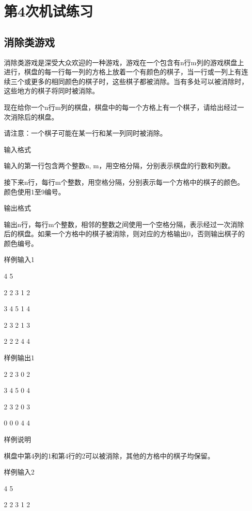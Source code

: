 %
%
%
\chapter{第4次机试练习}

\section{消除类游戏}
消除类游戏是深受大众欢迎的一种游戏，游戏在一个包含有n行m列的游戏棋盘上进行，棋盘的每一行每一列的方格上放着一个有颜色的棋子，当一行或一列上有连续三个或更多的相同颜色的棋子时，这些棋子都被消除。当有多处可以被消除时，这些地方的棋子将同时被消除。

现在给你一个n行m列的棋盘，棋盘中的每一个方格上有一个棋子，请给出经过一次消除后的棋盘。

请注意：一个棋子可能在某一行和某一列同时被消除。

输入格式

输入的第一行包含两个整数n, m，用空格分隔，分别表示棋盘的行数和列数。

接下来n行，每行m个整数，用空格分隔，分别表示每一个方格中的棋子的颜色。颜色使用1至9编号。

输出格式

输出n行，每行m个整数，相邻的整数之间使用一个空格分隔，表示经过一次消除后的棋盘。如果一个方格中的棋子被消除，则对应的方格输出0，否则输出棋子的颜色编号。

样例输入1

4 5

2 2 3 1 2

3 4 5 1 4

2 3 2 1 3

2 2 2 4 4

样例输出1

2 2 3 0 2

3 4 5 0 4

2 3 2 0 3

0 0 0 4 4

样例说明

棋盘中第4列的1和第4行的2可以被消除，其他的方格中的棋子均保留。

样例输入2

4 5

2 2 3 1 2

